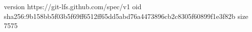 version https://git-lfs.github.com/spec/v1
oid sha256:9b158bb5f03b5f69ff6512ff65dd5abd76a4473896cb2c8305f60899f1e3f82b
size 7575
